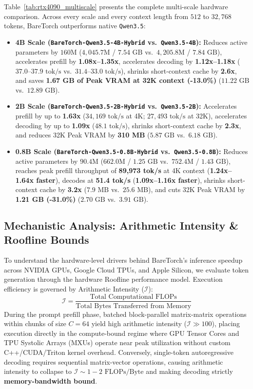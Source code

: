 \documentclass[twocolumn,10pt]{article}
\begin{document}
Table~\ref{tab:rtx4090_multiscale} presents the complete multi-scale hardware comparison. Across every scale and every context length from $512$ to $32,768$ tokens, BareTorch outperforms native \texttt{Qwen3.5}:
\begin{itemize}
    \item \textbf{4B Scale (\texttt{BareTorch-Qwen3.5-4B-Hybrid} vs.\ \texttt{Qwen3.5-4B}):} Reduces active parameters by $160\text{M}$ ($4,045.7\text{M}$ / $7.54\text{ GB}$ vs.\ $4,205.8\text{M}$ / $7.84\text{ GB}$), accelerates prefill by \textbf{1.08x--1.35x}, accelerates decoding by \textbf{1.12x--1.18x} ($37.0$--$37.9\text{ tok/s}$ vs.\ $31.4$--$33.0\text{ tok/s}$), shrinks short-context cache by \textbf{2.6x}, and saves \textbf{1.67 GB of Peak VRAM at 32K context (-13.0\%)} ($11.22\text{ GB}$ vs.\ $12.89\text{ GB}$).
    \item \textbf{2B Scale (\texttt{BareTorch-Qwen3.5-2B-Hybrid} vs.\ \texttt{Qwen3.5-2B}):} Accelerates prefill by up to \textbf{1.63x} ($34,169\text{ tok/s}$ at 4K; $27,493\text{ tok/s}$ at 32K), accelerates decoding by up to \textbf{1.09x} ($48.1\text{ tok/s}$), shrinks short-context cache by \textbf{2.3x}, and reduces 32K Peak VRAM by \textbf{310 MB} ($5.87\text{ GB}$ vs.\ $6.18\text{ GB}$).
    \item \textbf{0.8B Scale (\texttt{BareTorch-Qwen3.5-0.8B-Hybrid} vs.\ \texttt{Qwen3.5-0.8B}):} Reduces active parameters by $90.4\text{M}$ ($662.0\text{M}$ / $1.25\text{ GB}$ vs.\ $752.4\text{M}$ / $1.43\text{ GB}$), reaches peak prefill throughput of \textbf{89,973 tok/s} at 4K context (\textbf{1.24x--1.64x faster}), decodes at \textbf{51.4 tok/s} (\textbf{1.09x--1.16x faster}), shrinks short-context cache by \textbf{3.2x} ($7.9\text{ MB}$ vs.\ $25.6\text{ MB}$), and cuts 32K Peak VRAM by \textbf{1.21 GB (-31.0\%)} ($2.70\text{ GB}$ vs.\ $3.91\text{ GB}$).
\end{itemize}

\subsection{Mechanistic Analysis: Arithmetic Intensity \& Roofline Bounds}
To understand the hardware-level drivers behind BareTorch's inference speedup across NVIDIA GPUs, Google Cloud TPUs, and Apple Silicon, we evaluate token generation through the hardware Roofline performance model. Execution efficiency is governed by Arithmetic Intensity ($\mathcal{I}$):
\begin{equation*}
\mathcal{I} = \frac{\text{Total Computational FLOPs}}{\text{Total Bytes Transferred from Memory}}
\end{equation*}
During the prompt prefill phase, batched block-parallel matrix-matrix operations within chunks of size $C=64$ yield high arithmetic intensity ($\mathcal{I} \gg 100$), placing execution directly in the compute-bound regime where GPU Tensor Cores and TPU Systolic Arrays (MXUs) operate near peak utilization without custom C++/CUDA/Triton kernel overhead. Conversely, single-token autoregressive decoding requires sequential matrix-vector operations, causing arithmetic intensity to collapse to $\mathcal{I} \sim 1 - 2\text{ FLOPs/Byte}$ and making decoding strictly \textbf{memory-bandwidth bound}.
\end{document}
